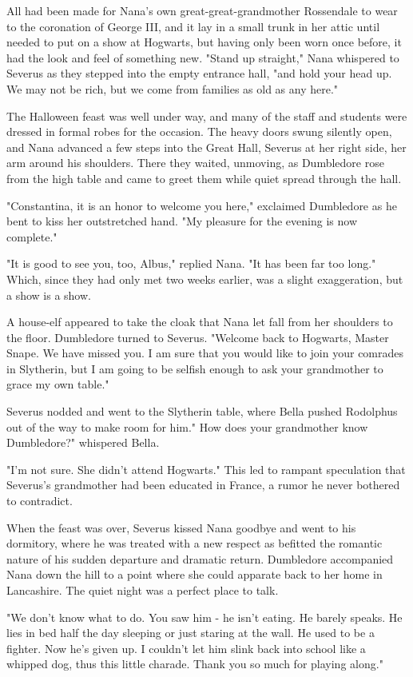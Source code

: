 \documentclass[a4paper,11pt]{article}
\begin{document}
All had been made for Nana's own great-great-grandmother Rossendale to wear to the coronation of George III, and it lay in a small trunk in her attic until needed to put on a show at Hogwarts, but having only been worn once before, it had the look and feel of something new. "Stand up straight," Nana whispered to Severus as they stepped into the empty entrance hall, "and hold your head up. We may not be rich, but we come from families as old as any here."

The Halloween feast was well under way, and many of the staff and students were dressed in formal robes for the occasion. The heavy doors swung silently open, and Nana advanced a few steps into the Great Hall, Severus at her right side, her arm around his shoulders. There they waited, unmoving, as Dumbledore rose from the high table and came to greet them while quiet spread through the hall.

"Constantina, it is an honor to welcome you here," exclaimed Dumbledore as he bent to kiss her outstretched hand. "My pleasure for the evening is now complete."

"It is good to see you, too, Albus," replied Nana. "It has been far too long." Which, since they had only met two weeks earlier, was a slight exaggeration, but a show is a show.

A house-elf appeared to take the cloak that Nana let fall from her shoulders to the floor. Dumbledore turned to Severus. "Welcome back to Hogwarts, Master Snape. We have missed you. I am sure that you would like to join your comrades in Slytherin, but I am going to be selfish enough to ask your grandmother to grace my own table."

Severus nodded and went to the Slytherin table, where Bella pushed Rodolphus out of the way to make room for him." How does your grandmother know Dumbledore?" whispered Bella.

"I'm not sure. She didn't attend Hogwarts." This led to rampant speculation that Severus's grandmother had been educated in France, a rumor he never bothered to contradict.

When the feast was over, Severus kissed Nana goodbye and went to his dormitory, where he was treated with a new respect as befitted the romantic nature of his sudden departure and dramatic return. Dumbledore accompanied Nana down the hill to a point where she could apparate back to her home in Lancashire. The quiet night was a perfect place to talk.

"We don't know what to do. You saw him - he isn't eating. He barely speaks. He lies in bed half the day sleeping or just staring at the wall. He used to be a fighter. Now he's given up. I couldn't let him slink back into school like a whipped dog, thus this little charade. Thank you so much for playing along."
\end{document}
